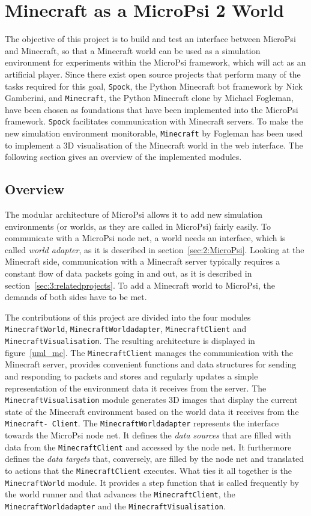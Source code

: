 \chapter{Minecraft as a MicroPsi 2 World}
\label{chap:4}
The objective of this project is to build and test an interface between MicroPsi and Minecraft, so that a Minecraft world can be used as a simulation environment for experiments within the MicroPsi framework, which will act as an artificial player. Since there exist open source projects that perform many of the tasks required for this goal, \texttt{Spock}, the Python Minecraft bot framework by Nick Gamberini, and \texttt{Minecraft}, the Python Minecraft clone by Michael Fogleman, have been chosen as foundations that have been implemented into the MicroPsi framework. \texttt{Spock} facilitates communication with Minecraft servers. To make the new simulation environment monitorable, \texttt{Minecraft} by Fogleman has been used to implement a 3D visualisation of the Minecraft world in the web interface. The following section gives an overview of the implemented modules.

\section{Overview}

The modular architecture of MicroPsi allows it to add new simulation environments (or worlds, as they are called in MicroPsi) fairly easily. To communicate with a MicroPsi node net, a world needs an interface, which is called \emph{world adapter}, as it is described in section~\ref{sec:2:MicroPsi}. Looking at the Minecraft side, communication with a Minecraft server typically requires a constant flow of data packets going in and out, as it is described in section~\ref{sec:3:relatedprojects}. To add a Minecraft world to MicroPsi, the demands of both sides have to be met.

The contributions of this project are divided into the four modules \texttt{MinecraftWorld}, \texttt{MinecraftWorldadapter}, \texttt{MinecraftClient} and \texttt{MinecraftVisualisation}. The resulting architecture is displayed in figure~\ref{uml_mc}. The \texttt{MinecraftClient} manages the communication with the Minecraft server, provides convenient functions and data structures for sending and responding to packets and stores and regularly updates a simple representation of the environment data it receives from the server. The \texttt{MinecraftVisualisation} module generates 3D images that display the current state of the Minecraft environment based on the world data it receives from the \texttt{Minecraft- Client}. The \texttt{MinecraftWorldadapter} represents the interface towards the MicroPsi node net. It defines the \emph{data sources} that are filled with data from the \texttt{MinecraftClient} and accessed by the node net. It furthermore defines the \emph{data targets} that, conversely, are filled by the node net and translated to actions that the \texttt{MinecraftClient} executes. What ties it all together is the \texttt{MinecraftWorld} module. It provides a step function that is called frequently by the world runner and that advances the \texttt{MinecraftClient}, the \texttt{MinecraftWorldadapter} and the \texttt{MinecraftVisualisation}.

